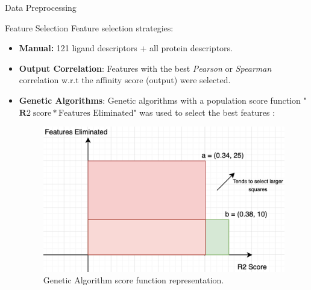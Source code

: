 \documentclass{beamer}
\begin{document}
\begin{frame}[t]{Data Preprocessing}
\end{frame}

\begin{frame}[t]{Feature Selection}
Feature selection strategies:
\begin{itemize}
\item \textbf{Manual:} 121 ligand descriptors + all protein descriptors.
\item \textbf{Output Correlation}: Features with the best \textit{Pearson} or \textit{Spearman} correlation w.r.t the affinity score (output) were selected.
\item \textbf{Genetic Algorithms}: Genetic algorithms with a population score function "$ \mathbf{R}2 \; \textrm{score} * \textrm{Features Eliminated} $" was used to select the best features \cite{geneticalgorithmsresearchpaper}:

\begin{figure}[htb]
  \centering
    \includegraphics[scale=0.25]{images/scoreFuntionMultiObject}
    \caption{Genetic Algorithm score function representation.}
    \label{fig:scorefunctionfigure}
\end{figure}

\end{itemize} 

\end{frame}
\end{document}

